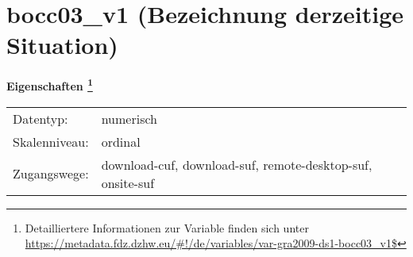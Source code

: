 
    \setcounter{footnote}{0}

    \vspace*{-1.8cm}
	\section{bocc03\_v1 (Bezeichnung derzeitige Situation)}
	\label{section:bocc03_v1}



    \vspace*{0.5cm}
    \noindent\textbf{Eigenschaften
	\footnote{Detailliertere Informationen zur Variable finden sich unter
		\url{https://metadata.fdz.dzhw.eu/\#!/de/variables/var-gra2009-ds1-bocc03_v1$}}}\\
	\begin{tabularx}{\hsize}{@{}lX}
	Datentyp: & numerisch \\
	Skalenniveau: & ordinal \\
	Zugangswege: &
	  download-cuf, 
	  download-suf, 
	  remote-desktop-suf, 
	  onsite-suf
 \\
    \end{tabularx}



